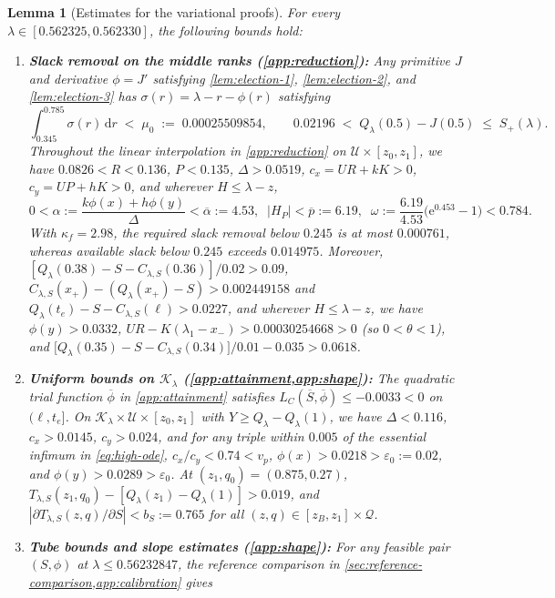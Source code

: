 \documentclass[11pt]{article}
\numberwithin{equation}{section}
\theoremstyle{plain}
\newtheorem{lemma}[theorem]{Lemma}
\theoremstyle{definition}
\newcommand{\1}{\mathbf{1}}
\newcommand{\calK}{\mathcal{K}}
\newcommand{\calQ}{\mathcal{Q}}
\newcommand{\calU}{\mathcal{U}}
\begin{document}
\begin{lemma}[Estimates for the variational proofs]
\label{lem:variational-estimates}
For every $\lambda \in [0.562325, 0.562330]$, the following bounds hold:
\begin{enumerate}[label=(\roman*)]
  \item \textbf{Slack removal on the middle ranks (\cref{app:reduction}):} Any primitive $J$ and derivative $\phi = J'$ satisfying \cref{lem:election-1}, \cref{lem:election-2}, and \cref{lem:election-3} has $\sigma(r) = \lambda - r - \phi(r)$ satisfying
  \[
    \int_{0.345}^{0.785} \sigma(r)\,\mathrm{d}r \;<\; \mu_0 \;:=\; 0.00025509854,
    \qquad
    0.02196 \;<\; Q_\lambda(0.5) - J(0.5) \;\le\; S_+(\lambda).
  \]
  Throughout the linear interpolation in \cref{app:reduction} on $\calU \times [z_0, z_1]$, we have $0.0826 < R < 0.136$, $P < 0.135$, $\Delta > 0.0519$, $c_x = U R + k K > 0$, $c_y = U P + h K > 0$, and wherever $H \le \lambda - z$,
  \[
    0 < \alpha := \frac{k\phi(x) + h\phi(y)}{\Delta} < \overline{\alpha} := 4.53,
    \;\;
    |H_P| < \overline{p} := 6.19,
    \;\;
    \omega := \frac{6.19}{4.53}\bigl(\mathrm{e}^{0.453} - 1\bigr) < 0.784.
  \]
  With $\kappa_f = 2.98$, the required slack removal below $0.245$ is at most $0.000761$, whereas available slack below $0.245$ exceeds $0.014975$. Moreover, $[Q_\lambda(0.38)-S-C_{\lambda,S}(0.36)]/0.02>0.09$, $C_{\lambda, S}(x_+) - (Q_\lambda(x_+) - S) > 0.002449158$ and $Q_\lambda(t_e) - S - C_{\lambda, S}(\ell) > 0.0227$, and wherever $H \le \lambda - z$, we have $\phi(y) > 0.0332$, $U R - K(\lambda_1 - x_-) > 0.00030254668 > 0$ (so $0 < \theta < 1$), and $\bigl[Q_\lambda(0.35) - S - C_{\lambda, S}(0.34)\bigr]/0.01 - 0.035 > 0.0618$.
  \item \textbf{Uniform bounds on $\calK_\lambda$ (\cref{app:attainment,app:shape}):} The quadratic trial function $\overline{\phi}$ in \cref{app:attainment} satisfies $L_C(\overline{S}, \overline{\phi}) \le -0.0033 < 0$ on $(\ell, t_e]$. On $\calK_\lambda \times \calU \times [z_0, z_1]$ with $Y \ge Q_\lambda - Q_\lambda(1)$, we have $\Delta < 0.116$, $c_x > 0.0145$, $c_y > 0.024$, and for any triple within $0.005$ of the essential infimum in \cref{eq:high-ode}, $c_x/c_y < 0.74 < v_p$, $\phi(x) > 0.0218 > \varepsilon_0 := 0.02$, and $\phi(y) > 0.0289 > \varepsilon_0$. At $(z_1, q_0) = (0.875, 0.27)$, $T_{\lambda, S}(z_1, q_0) - [Q_\lambda(z_1) - Q_\lambda(1)] > 0.019$, and $|\partial T_{\lambda, S}(z, q)/\partial S| < b_S := 0.765$ for all $(z, q) \in [z_B, z_1] \times \calQ$.
  \item \textbf{Tube bounds and slope estimates (\cref{app:shape}):} For any feasible pair $(S, \phi)$ at $\lambda \le 0.56232847$, the reference comparison in \cref{sec:reference-comparison,app:calibration} gives

\end{enumerate}
\end{lemma}
\end{document}
